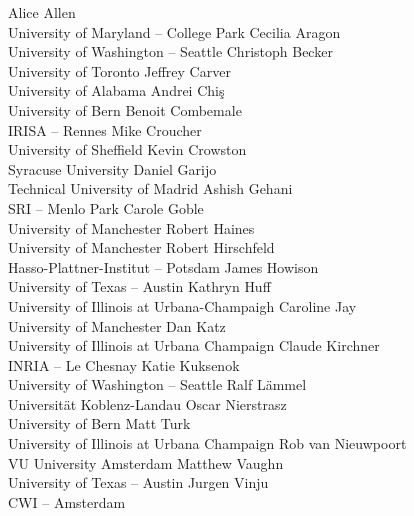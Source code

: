 \documentclass[a4paper,UKenglish]{dagman}
\begin{document}
\begin{participants}
\participant Alice Allen\\ University of Maryland -- College Park
\participant Cecilia Aragon\\ University of Washington -- Seattle
\participant Christoph Becker\\ University of Toronto
\participant Jeffrey Carver\\ University of Alabama
\participant Andrei Chi\c{s}\\ University of Bern
\participant Benoit Combemale\\ IRISA -- Rennes
\participant Mike Croucher\\ University of Sheffield
\participant Kevin Crowston\\ Syracuse University
\participant Daniel Garijo\\ Technical University of Madrid
\participant Ashish Gehani\\ SRI -- Menlo Park
\participant Carole Goble\\ University of Manchester
\participant Robert Haines\\ University of Manchester
\participant Robert Hirschfeld\\ Hasso-Plattner-Institut -- Potsdam
\participant James Howison\\ University of Texas -- Austin
\participant Kathryn Huff\\ University of Illinois at Urbana-Champaigh
\participant Caroline Jay\\ University of Manchester
\participant Dan Katz\\ University of Illinois at Urbana Champaign
\participant Claude Kirchner\\ INRIA -- Le Chesnay
\participant Katie Kuksenok\\ University of Washington -- Seattle
\participant Ralf L\"ammel\\ Universit\"at Koblenz-Landau
\participant Oscar Nierstrasz\\ University of Bern
\participant Matt Turk\\ University of Illinois at Urbana Champaign
\participant Rob van Nieuwpoort\\ VU University Amsterdam
\participant Matthew Vaughn\\ University of Texas -- Austin
\participant Jurgen Vinju\\ CWI -- Amsterdam
\end{participants}
\end{document}
